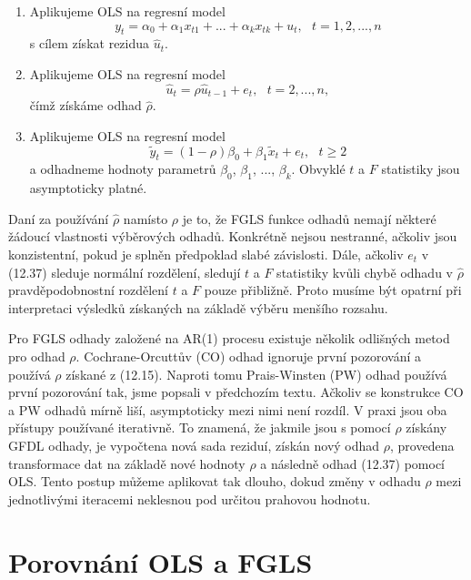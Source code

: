 \begin{enumerate}
\item Aplikujeme OLS na regresní model
\begin{equation}
y_t = \alpha_0 + \alpha_1 x_{t1} + ... + \alpha_k x_{tk} + u_t, ~~~ t = 1, 2, ..., n
\end{equation}
s cílem získat rezidua $\hat{u}_t$.
\item Aplikujeme OLS na regresní model
\begin{equation}
\hat{u}_t = \rho \hat{u}_{t - 1} + e_t, ~~~ t = 2, ..., n,
\end{equation}
čímž získáme odhad $\hat{\rho}$.
\item Aplikujeme OLS na regresní model
\begin{equation}
\tilde{y}_t = (1 - \rho) \beta_0 + \beta_1 \tilde{x}_t + e_t, ~~~ t \ge 2
\end{equation}
a odhadneme hodnoty parametrů $\beta_0$, $\beta_1$, ..., $\beta_k$. Obvyklé $t$ a $F$ statistiky jsou asymptoticky platné.
\end{enumerate}

Daní za používání $\hat{\rho}$ namísto $\rho$ je to, že FGLS funkce odhadů nemají některé žádoucí vlastnosti výběrových odhadů. Konkrétně nejsou nestranné, ačkoliv jsou konzistentní, pokud je splněn předpoklad slabé závislosti. Dále, ačkoliv $e_t$ v (12.37) sleduje normální rozdělení, sledují $t$ a $F$ statistiky kvůli chybě odhadu v $\hat{\rho}$ pravděpodobnostní rozdělení $t$ a $F$ pouze přibližně. Proto musíme být opatrní při interpretaci výsledků získaných na základě výběru menšího rozsahu.

Pro FGLS odhady založené na AR(1) procesu existuje několik odlišných metod pro odhad $\rho$. Cochrane-Orcuttův (CO) odhad ignoruje první pozorování a používá $\rho$ získané z (12.15). Naproti tomu Prais-Winsten (PW) odhad používá první pozorování tak, jsme popsali v předchozím textu. Ačkoliv se konstrukce CO a PW odhadů mírně liší, asymptoticky mezi nimi není rozdíl. V praxi jsou oba přístupy používané iterativně. To znamená, že jakmile jsou s pomocí $\hat{\rho}$ získány GFDL odhady, je vypočtena nová sada reziduí, získán nový odhad $\rho$, provedena transformace dat na základě nové hodnoty $\rho$ a následně odhad (12.37) pomocí OLS. Tento postup můžeme aplikovat tak dlouho, dokud změny v odhadu $\rho$ mezi jednotlivými iteracemi neklesnou pod určitou prahovou hodnotu.

\section{Porovnání OLS a FGLS}

